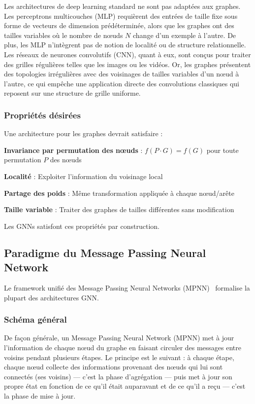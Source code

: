 Les architectures de deep learning standard ne sont pas adaptées aux graphes. Les perceptrons multicouches (MLP) requièrent des entrées de taille fixe sous forme de vecteurs de dimension prédéterminée, alors que les graphes ont des tailles variables où le nombre de nœuds $N$ change d'un exemple à l'autre. De plus, les MLP n'intègrent pas de notion de localité ou de structure relationnelle. Les réseaux de neurones convolutifs (CNN), quant à eux, sont conçus pour traiter des grilles régulières telles que les images ou les vidéos. Or, les graphes présentent des topologies irrégulières avec des voisinages de tailles variables d'un nœud à l'autre, ce qui empêche une application directe des convolutions classiques qui reposent sur une structure de grille uniforme.

\subsubsection{Propriétés désirées}

Une architecture pour les graphes devrait satisfaire :

\textbf{Invariance par permutation des nœuds} : $f(P \cdot G) = f(G)$ pour toute permutation $P$ des nœuds

\textbf{Localité} : Exploiter l'information du voisinage local

\textbf{Partage des poids} : Même transformation appliquée à chaque nœud/arête

\textbf{Taille variable} : Traiter des graphes de tailles différentes sans modification

Les GNNs satisfont ces propriétés par construction.

\subsection{Paradigme du Message Passing Neural Network}

Le framework unifié des Message Passing Neural Networks (MPNN)~\cite{Gilmer2017} formalise la plupart des architectures GNN.

\subsubsection{Schéma général}

De façon générale, un Message Passing Neural Network (MPNN) met à jour l'information de chaque nœud du graphe en faisant circuler des messages entre voisins pendant plusieurs étapes. Le principe est le suivant : à chaque étape, chaque nœud collecte des informations provenant des nœuds qui lui sont connectés (ses voisins) — c'est la phase d'agrégation — puis met à jour son propre état en fonction de ce qu'il était auparavant et de ce qu'il a reçu — c'est la phase de mise à jour.

